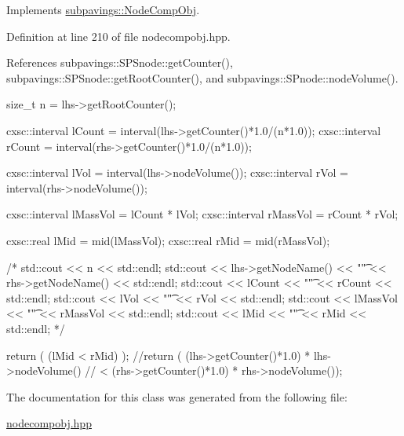 \-Implements \hyperlink{classsubpavings_1_1NodeCompObj_a121d53049c5ed1c0924313951d6aa630}{subpavings\-::\-Node\-Comp\-Obj}.



\-Definition at line 210 of file nodecompobj.\-hpp.



\-References subpavings\-::\-S\-P\-Snode\-::get\-Counter(), subpavings\-::\-S\-P\-Snode\-::get\-Root\-Counter(), and subpavings\-::\-S\-Pnode\-::node\-Volume().


\begin{DoxyCode}
      { 
        size_t n = lhs->getRootCounter();
        
        cxsc::interval lCount = interval(lhs->getCounter()*1.0/(n*1.0));
        cxsc::interval rCount = interval(rhs->getCounter()*1.0/(n*1.0));
        
        cxsc::interval lVol = interval(lhs->nodeVolume());
        cxsc::interval rVol = interval(rhs->nodeVolume());
        
        cxsc::interval lMassVol = lCount * lVol;
        cxsc::interval rMassVol = rCount * rVol;
       
        cxsc::real lMid = mid(lMassVol);
        cxsc::real rMid = mid(rMassVol);
        
        /*
        std::cout << n << std::endl;
        std::cout << lhs->getNodeName() << "\t" << rhs->getNodeName() <<
       std::endl;
        std::cout << lCount << "\t" << rCount << std::endl;
        std::cout << lVol << "\t" << rVol << std::endl;
        std::cout << lMassVol << "\t" << rMassVol << std::endl;
        std::cout << lMid << "\t" << rMid << std::endl;
        */
        
        return ( (lMid < rMid) );
        //return ( (lhs->getCounter()*1.0) * lhs->nodeVolume() 
        //      < (rhs->getCounter()*1.0) * rhs->nodeVolume()); 
    }
\end{DoxyCode}


\-The documentation for this class was generated from the following file\-:\begin{DoxyCompactItemize}
\item 
\hyperlink{nodecompobj_8hpp}{nodecompobj.\-hpp}\end{DoxyCompactItemize}
